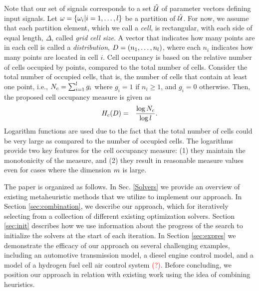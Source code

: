 Note that our set of signals corresponds to a set $\hat{\mathcal{U}}$ of parameter vectors defining input signals.
Let $\omega=\{ \omega_i | i=1,\ldots,
l \}$ be a partition of $\hat{\mathcal{U}}$. For now, we assume that each partition element,
which we call a \emph{cell}, is rectangular, with each side of equal
length, $\Delta$, called \emph{grid cell size}. A
vector that indicates how many points are in each cell is called a
\emph{distribution}, $D=(n_1,\ldots,n_l)$,
where each $n_i$ indicates how many points are located in cell $i$.
Cell occupancy is based on the relative number of cells occupied by
points, compared to the total number of cells. Consider the total
number of occupied cells, that is, the number of cells that contain
at least one point, i.e., $N_c =  \sum_{i=1}^{l} g_i$  
where $g_i = 1$ if  $n_i\geq 1$, and $g_i = 0$ otherwise. Then, the proposed cell occupancy measure is given as
\begin{eqnarray*}
H_c(D) & = & \frac{\log N_c}{\log l}.
\end{eqnarray*}
Logarithm functions are used due to the fact that the total number of cells could be very large as compared to the number of occupied cells. The logarithms provide two key features for the cell occupancy measure: (1) they maintain the monotonicity of the measure, and (2) they result in reasonable measure values even for cases where the dimension $m$ is  large. 


The paper is organized as follows. 
In Sec. \ref{Solvers} we provide an overview of existing metaheuristic methods that we utilize to implement our approach. 
In Section \ref{sec:combination}, we describe our approach, which for iteratively selecting from a collection of different existing optimization solvers.
Section \ref{sec:init} describes how we use information about the progress of the search to initialize the solvers at the start of each iteration. 
In Section \ref{sec:expres} we demonstrate the efficacy of our approach on several challenging examples, including an automotive transmission model, a diesel engine control model, and a model of a hydrogen fuel cell air control system \textcolor{red}{(?)}. Before concluding, we position our approach in relation with existing work using the idea of combining heuristics. 

